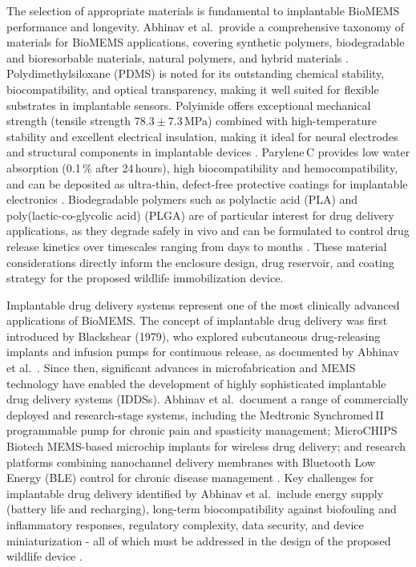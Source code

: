 \documentclass[12pt,a4paper]{article}
\begin{document}
    The selection of appropriate materials is fundamental to implantable BioMEMS performance
    and longevity. Abhinav et al.\ provide a comprehensive taxonomy of materials for BioMEMS
    applications, covering synthetic polymers, biodegradable and bioresorbable materials,
    natural polymers, and hybrid materials \cite{abhinav2025}. Polydimethylsiloxane (PDMS) is
    noted for its outstanding chemical stability, biocompatibility, and optical transparency,
    making it well suited for flexible substrates in implantable sensors. Polyimide offers
    exceptional mechanical strength (tensile strength $78.3 \pm 7.3$\,MPa) combined with
    high-temperature stability and excellent electrical insulation, making it ideal for neural
    electrodes and structural components in implantable devices \cite{abhinav2025}. Parylene\,C
    provides low water absorption (0.1\,\% after 24\,hours), high biocompatibility and
    hemocompatibility, and can be deposited as ultra-thin, defect-free protective coatings for
    implantable electronics \cite{abhinav2025}. Biodegradable polymers such as polylactic acid
    (PLA) and poly(lactic-co-glycolic acid) (PLGA) are of particular interest for drug delivery
    applications, as they degrade safely in vivo and can be formulated to control drug release
    kinetics over timescales ranging from days to months \cite{abhinav2025}. These material
    considerations directly inform the enclosure design, drug reservoir, and coating strategy
    for the proposed wildlife immobilization device.

    Implantable drug delivery systems represent one of the most clinically advanced
    applications of BioMEMS. The concept of implantable drug delivery was first introduced
    by Blackshear (1979), who explored subcutaneous drug-releasing implants and infusion
    pumps for continuous release, as documented by Abhinav et al.\ \cite{abhinav2025}. Since
    then, significant advances in microfabrication and MEMS technology have enabled the
    development of highly sophisticated implantable drug delivery systems (IDDSs). Abhinav
    et al.\ document a range of commercially deployed and research-stage systems, including
    the Medtronic Synchromed\,II programmable pump for chronic pain and spasticity
    management; MicroCHIPS Biotech MEMS-based microchip implants for wireless drug
    delivery; and research platforms combining nanochannel delivery membranes with
    Bluetooth Low Energy (BLE) control for chronic disease management \cite{abhinav2025}.
    Key challenges for implantable drug delivery identified by Abhinav et al.\ include energy
    supply (battery life and recharging), long-term biocompatibility against biofouling and
    inflammatory responses, regulatory complexity, data security, and device
    miniaturization - all of which must be addressed in the design of the proposed wildlife
    device \cite{abhinav2025}.
\end{document}
